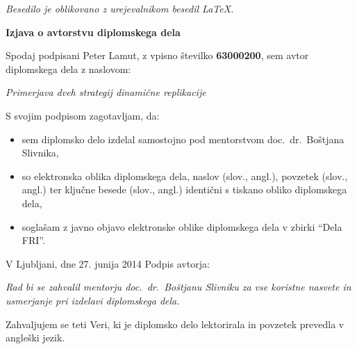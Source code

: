 \documentclass[a4paper, 12pt]{book}
\newcommand{\clearemptydoublepage}{
	\newpage{\pagestyle{empty}\cleardoublepage}}
\begin{document}
\begin{center} 
\mbox{}\vfill
\emph{Besedilo je oblikovano z urejevalnikom besedil \LaTeX.} 
\end{center}


\clearemptydoublepage


\label{izjava_avtorstvo}

\vspace*{1cm}
\begin{center} 
{\Large \textbf{\sc Izjava o avtorstvu diplomskega dela}}
\end{center}

\vspace{1cm}
\noindent Spodaj podpisani Peter Lamut,
z vpisno številko \textbf{63000200}, sem avtor diplomskega dela z naslovom:
   
\vspace{0.5cm}
\centerline{\emph{Primerjava dveh strategij dinamične replikacije}}

\vspace{1.5cm}
\noindent S svojim podpisom zagotavljam, da:

\begin{itemize}
	\item sem diplomsko delo izdelal samostojno pod mentorstvom doc.\ dr.\ 
	Boštjana Slivnika,

	\item so elektronska oblika diplomskega dela, naslov (slov., angl.),
	 povzetek (slov., angl.) ter ključne besede (slov., angl.) identični
	 s tiskano obliko diplomskega dela,
	
	\item soglašam z javno objavo elektronske oblike diplomskega dela
	v zbirki ``Dela FRI''.
\end{itemize}

\vspace{1cm}

\noindent V Ljubljani, dne 27. junija 2014 \hfill
Podpis avtorja:

\clearemptydoublepage



\label{zahvala}
\thispagestyle{empty}\mbox{}\vfill\null\it%
Rad bi se zahvalil mentorju doc.~dr.~Boštjanu Slivniku za vse koristne nasvete
in usmerjanje pri izdelavi diplomskega dela.

Zahvaljujem se teti Veri, ki je diplomsko delo lektorirala in povzetek
prevedla v angleški jezik.
\end{document}
